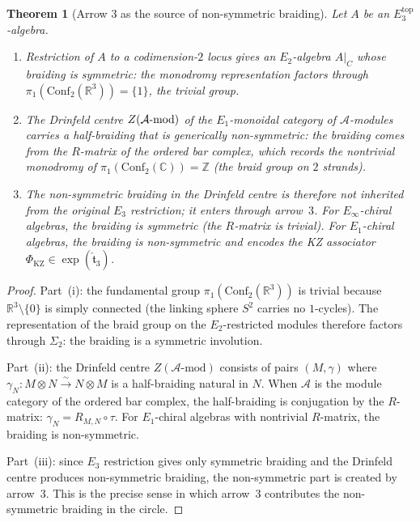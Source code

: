 \documentclass[11pt,reqno]{amsart}
\newtheorem{theorem}{Theorem}[section]
\theoremstyle{definition}
\theoremstyle{remark}
\providecommand{\cA}{\mathcal{A}}
\providecommand{\Conf}{\mathrm{Conf}}
\providecommand{\Eone}{E_1}
\providecommand{\Etwo}{E_2}
\providecommand{\Ethree}{E_3}
\providecommand{\Einf}{E_\infty}
\providecommand{\bC}{\mathbb{C}}
\providecommand{\bR}{\mathbb{R}}
\providecommand{\bZ}{\mathbb{Z}}
\begin{document}
\begin{theorem}[Arrow 3 as the source of non-symmetric braiding]
\label{thm:e-arrow3-braiding}
Let $A$ be an $\Ethree^{\mathrm{top}}$-algebra.
\begin{enumerate}[label=\textup{(\roman*)}]
\item Restriction of $A$ to a codimension-$2$ locus gives
 an $\Etwo$-algebra $A|_C$ whose braiding is
 \emph{symmetric}: the monodromy representation factors
 through $\pi_1(\Conf_2(\bR^3)) = \{1\}$, the trivial
 group.
\item The Drinfeld centre $Z(\cA\textup{-mod})$ of the
 $\Eone$-monoidal category of $\cA$-modules carries a
 half-braiding that is generically \emph{non-symmetric}:
 the braiding comes from the $R$-matrix of the ordered
 bar complex, which records the nontrivial monodromy of
 $\pi_1(\Conf_2(\bC)) = \bZ$ (the braid group on $2$
 strands).
\item The non-symmetric braiding in the Drinfeld centre is
 therefore not inherited from the original $\Ethree$
 restriction; it enters through arrow~$3$. For
 $\Einf$-chiral algebras, the braiding is symmetric
 \textup{(}the $R$-matrix is trivial\textup{)}. For
 $\Eone$-chiral algebras, the braiding is non-symmetric
 and encodes the KZ associator
 $\Phi_{\mathrm{KZ}} \in \exp(\hat{\mathfrak{t}}_3)$.
\end{enumerate}
\end{theorem}

\begin{proof}
Part~(i): the fundamental group $\pi_1(\Conf_2(\bR^3))$ is
trivial because $\bR^3 \setminus \{0\}$ is simply connected
(the linking sphere $S^2$ carries no $1$-cycles). The
representation of the braid group on the $\Etwo$-restricted
modules therefore factors through $\Sigma_2$: the braiding
is a symmetric involution.

Part~(ii): the Drinfeld centre $Z(\cA\text{-mod})$ consists
of pairs $(M, \gamma)$ where $\gamma_N \colon M \otimes N
\xrightarrow{\sim} N \otimes M$ is a half-braiding natural
in $N$. When $\cA$ is the module category of the ordered
bar complex, the half-braiding is conjugation by the
$R$-matrix: $\gamma_N = R_{M,N} \circ \tau$. For
$\Eone$-chiral algebras with nontrivial $R$-matrix, the
braiding is non-symmetric.

Part~(iii): since $\Ethree$ restriction gives only symmetric
braiding and the Drinfeld centre produces non-symmetric
braiding, the non-symmetric part is created by arrow~$3$.
This is the precise sense in which arrow~$3$ contributes the
non-symmetric braiding in the circle.
\end{proof}
\end{document}
